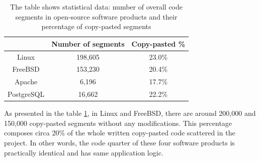\documentclass{report}
\begin{document}
\begin{table}[h]
\centering
\begin{tabular}{|c|c|c|}
\hline
\rowcolor[HTML]{C0C0C0} 
\multicolumn{1}{|l|}{\cellcolor[HTML]{C0C0C0}\textbf{Project}} & \multicolumn{1}{l|}{\cellcolor[HTML]{C0C0C0}\textbf{Number of segments}} & \multicolumn{1}{l|}{\cellcolor[HTML]{C0C0C0}\textbf{Copy-pasted \%}} \\ \hline
Linux                                                          & 198,605                                                                   & 23.0\%                                                               \\ \hline
FreeBSD                                                        & 153,230                                                                   & 20.4\%                                                               \\ \hline
Apache                                                         & 6,196                                                                     & 17.7\%                                                               \\ \hline
PostgreSQL                                                     & 16,662                                                                     & 22.2\%                                                               \\ \hline
\end{tabular}
\caption[Statistical data of clones detected in open-source products]{The table shows statistical data: number of overall code segments in open-source software products and their percentage of copy-pasted segments}
\label{table:products-compare}
\end{table}
As presented in the table \ref{table:products-compare}, in Linux and FreeBSD, there are around 200,000 and 150,000 copy-pasted segments without any modifications. This percentage composes circa 20\% of the whole written copy-pasted code scattered in the project. In other words, the code quarter of these four software products is practically identical and has same application logic.

\newpage	
\end{document}
